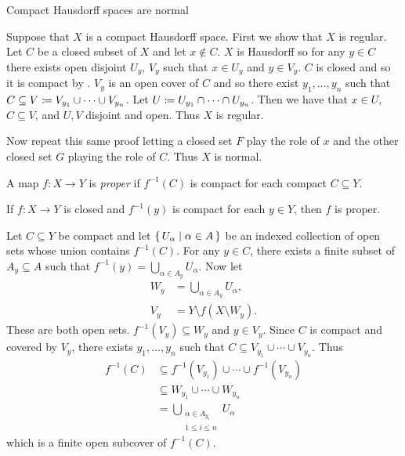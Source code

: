 \documentclass[letterpaper, 11pt, oneside]{book}
\begin{document}
\begin{thrm}\label{thrm: compact_haus_is_norm}
  Compact Hausdorff spaces are normal
\end{thrm}
\begin{pf}
  Suppose that $X$ is a compact Hausdorff space.
  First we show that $X$ is regular.
  Let $C$ be a closed subset of $X$ and let $x \notin C$.
  $X$ is Hausdorff so for any $y \in C$ there exists open disjoint $U_{y}$, $V_{y}$ such that $x \in U_{y}$ and $y \in V_{y}$.
  $C$ is closed and so it is compact by .
  $V_{y}$ is an open cover of $C$ and so there exist $y_{1}, \ldots, y_{n}$ such that $C \subseteq V \coloneqq V_{y_{1}} \cup \cdots \cup V_{y_{n}}$.
  Let $U \coloneqq U_{y_{1}} \cap \cdots \cap U_{y_{n}}$.
  Then we have that $x \in U$, $C \subseteq V$, and $U, V$ disjoint and open.
  Thus $X$ is regular.

  Now repeat this same proof letting a closed set $F$ play the role of $x$ and the other closed set $G$ playing the role of $C$.
  Thus $X$ is normal.
\end{pf}

\begin{defn}
  A map $f\colon X \to Y$ is \emph{proper} if $f^{-1}(C)$ is compact for each compact $C \subseteq Y$.
\end{defn}

\clearpage

\begin{thrm}\label{thrm: closed_single_point_preimage_compact}
  If $f\colon X \to Y$ is closed and $f^{-1}(y)$ is compact for each $y \in Y$, then $f$ is proper.
\end{thrm}
\begin{pf}
  Let $C \subseteq Y$ be compact and let $\set{U_{\alpha} | \alpha \in A}$ be an indexed collection of open sets whose union contains $f^{-1}(C)$.
  For any $y \in C$, there exists a finite subset of $A_{y} \subseteq A$ such that $f^{-1}(y) = \bigcup_{\alpha \in A_{y}} U_{\alpha}$.
  Now let
  \begin{align*}
    W_{y} &= \bigcup_{\alpha \in A_{y}} U_{\alpha}, \\
    V_{y} &= Y \setminus f(X \setminus W_{y}).
  \end{align*}
  These are both open sets.
  $f^{-1}(V_{y}) \subseteq W_{y}$ and $y \in V_{y}$.
  Since $C$ is compact and covered by $V_{y}$, there exists $y_{1}, \ldots, y_{n}$ such that $C \subseteq V_{y_{1}} \cup \cdots \cup V_{y_{n}}$.
  Thus
  \begin{align*}
    f^{-1}(C) &\subseteq f^{-1}(V_{y_{1}}) \cup \cdots \cup f^{-1}(V_{y_{n}}) \\
              &\subseteq W_{y_{1}} \cup \cdots \cup W_{y_{n}} \\
              &= \bigcup_{\substack{\alpha \in A_{y_{i}} \\ 1 \leq i \leq n}} U_{\alpha}
  \end{align*}
  which is a finite open subcover of $f^{-1}(C)$.
\end{pf}
\end{document}
